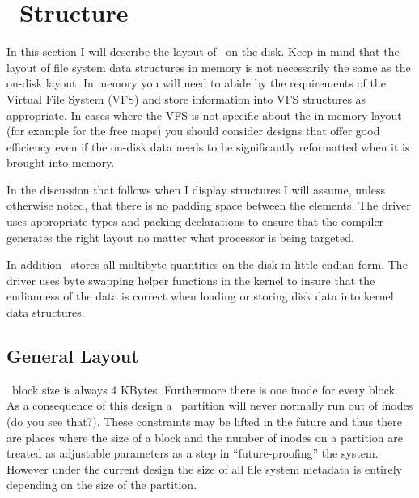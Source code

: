 %
%
%
%

\section{\GenericFS\ Structure}
\label{sec:structure}

In this section I will describe the layout of \GenericFS\ on the disk. Keep in mind that the
layout of file system data structures in memory is not necessarily the same as the on-disk
layout. In memory you will need to abide by the requirements of the Virtual File System (VFS)
and store information into VFS structures as appropriate. In cases where the VFS is not specific
about the in-memory layout (for example for the free maps) you should consider designs that
offer good efficiency even if the on-disk data needs to be significantly reformatted when it is
brought into memory.

In the discussion that follows when I display structures I will assume, unless otherwise noted,
that there is no padding space between the elements. The driver uses appropriate types and
packing declarations to ensure that the compiler generates the right layout no matter what
processor is being targeted.

In addition \GenericFS\ stores all multibyte quantities on the disk in little endian form. The
driver uses byte swapping helper functions in the kernel to insure that the endianness of the
data is correct when loading or storing disk data into kernel data structures.

\subsection{General Layout}
\label{sec:structure-general}

\GenericFS\ block size is always 4 KBytes. Furthermore there is one inode for every block. As a
consequence of this design a \GenericFS\ partition will never normally run out of inodes (do you
see that?). These constraints may be lifted in the future and thus there are places where the
size of a block and the number of inodes on a partition are treated as adjustable parameters
as a step in ``future-proofing'' the system. However under the current design the size of all
file system metadata is entirely depending on the size of the partition.

